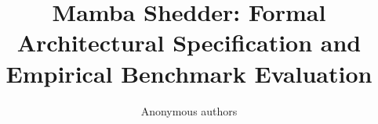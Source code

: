 \title{\textbf{Mamba Shedder: Formal Architectural Specification and Empirical Benchmark Evaluation}}

\author{Anonymous authors}
